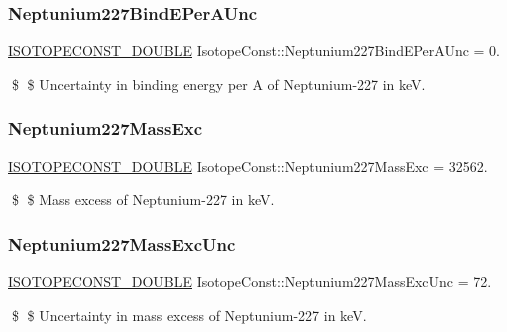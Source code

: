 \subsubsection{\texorpdfstring{Neptunium227\+Bind\+E\+Per\+A\+Unc}{Neptunium227BindEPerAUnc}}
{\footnotesize\ttfamily \mbox{\hyperlink{group___isotope_const-_macros_ga8f45a7272ce02c0b4c65c44636ed719a}{I\+S\+O\+T\+O\+P\+E\+C\+O\+N\+S\+T\+\_\+\+D\+O\+U\+B\+LE}} Isotope\+Const\+::\+Neptunium227\+Bind\+E\+Per\+A\+Unc = 0.}

\$ \$ Uncertainty in binding energy per A of Neptunium-\/227 in keV. \mbox{\label{group___isotope_const-_neptunium-_np227_ga2987f1c230b0526a5a9dfbf3b077e48c}} 
\subsubsection{\texorpdfstring{Neptunium227\+Mass\+Exc}{Neptunium227MassExc}}
{\footnotesize\ttfamily \mbox{\hyperlink{group___isotope_const-_macros_ga8f45a7272ce02c0b4c65c44636ed719a}{I\+S\+O\+T\+O\+P\+E\+C\+O\+N\+S\+T\+\_\+\+D\+O\+U\+B\+LE}} Isotope\+Const\+::\+Neptunium227\+Mass\+Exc = 32562.}

\$ \$ Mass excess of Neptunium-\/227 in keV. \mbox{\label{group___isotope_const-_neptunium-_np227_ga22e377312bcd4f93d1aea5c63d53a407}} 
\subsubsection{\texorpdfstring{Neptunium227\+Mass\+Exc\+Unc}{Neptunium227MassExcUnc}}
{\footnotesize\ttfamily \mbox{\hyperlink{group___isotope_const-_macros_ga8f45a7272ce02c0b4c65c44636ed719a}{I\+S\+O\+T\+O\+P\+E\+C\+O\+N\+S\+T\+\_\+\+D\+O\+U\+B\+LE}} Isotope\+Const\+::\+Neptunium227\+Mass\+Exc\+Unc = 72.}

\$ \$ Uncertainty in mass excess of Neptunium-\/227 in keV. \mbox{\label{group___isotope_const-_neptunium-_np227_ga76857ddbb6b613d59ae615852bc15f0a}} 
